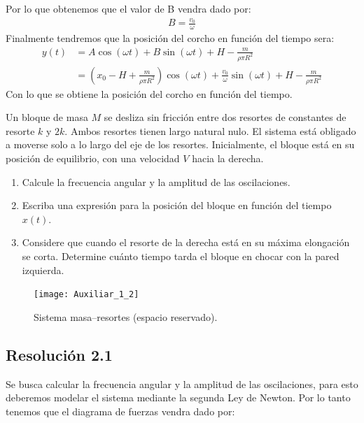 \documentclass[
  11pt,
  letterpaper,
   addpoints,
   answers
  ]{exam}
\begin{document}
\begin{questions}
\begin{solution}
Por lo que obtenemos que el valor de B vendra dado por:
\begin{align}
    B = \frac{v_0}{\omega}
\end{align}
Finalmente tendremos que la posición del corcho en función del tiempo sera:
\begin{align}
    y(t) &= A \cos(\omega t) + B \sin(\omega t) + H - \frac{m}{\rho \pi R^2}\\
    &= \left( x_0 - H + \frac{m}{\rho \pi R^2} \right) \cos(\omega t) + \frac{v_0}{\omega} \sin(\omega t) + H - \frac{m}{\rho \pi R^2}
\end{align}
Con lo que se obtiene la posición del corcho en función del tiempo.
\end{solution}
\question Un bloque de masa $M$ se desliza sin fricción entre dos resortes de constantes de resorte $k$ y $2k$. Ambos resortes tienen largo natural nulo. El sistema está obligado a moverse solo a lo largo del eje de los resortes. Inicialmente, el bloque está en su posición de equilibrio, con una velocidad $V$ hacia la derecha.

\begin{enumerate}
    \item Calcule la frecuencia angular y la amplitud de las oscilaciones.
    \item Escriba una expresión para la posición del bloque en función del tiempo $x(t)$.
    \item  Considere que cuando el resorte de la derecha está en su máxima elongación se corta. Determine cuánto tiempo tarda el bloque en chocar con la pared izquierda.
\end{enumerate}

\begin{figure}[h!]
    \centering
    \texttt{[image: Auxiliar\_1\_2]}
    \caption{Sistema masa–resortes (espacio reservado).}
    \label{fig:masa_resortes}
\end{figure}
\begin{solution}

\subsection*{Resolución 2.1 }
Se busca calcular la frecuencia angular y la amplitud de las oscilaciones, para esto deberemos modelar el sistema mediante la segunda Ley de Newton. Por lo tanto tenemos que el diagrama de fuerzas vendra dado por:


\end{solution}
\end{questions}
\end{document}
